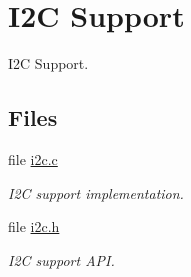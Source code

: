 \hypertarget{group__lpc32xx__i2c}{}\section{I2C Support}
\label{group__lpc32xx__i2c}


I2C Support.  


\subsection*{Files}
\begin{DoxyCompactItemize}
\item 
file \mbox{\hyperlink{arm_2lpc32xx_2i2c_2i2c_8c}{i2c.\+c}}
\begin{DoxyCompactList}\small\item\em I2C support implementation. \end{DoxyCompactList}\item 
file \mbox{\hyperlink{bsps_2arm_2lpc32xx_2include_2bsp_2i2c_8h}{i2c.\+h}}
\begin{DoxyCompactList}\small\item\em I2C support A\+PI. \end{DoxyCompactList}\end{DoxyCompactItemize}
